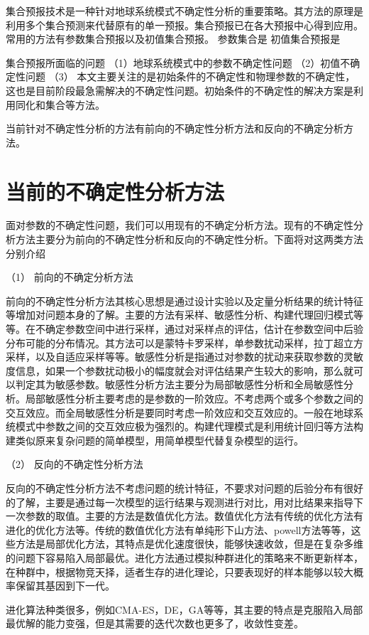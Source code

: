 集合预报技术是一种针对地球系统模式不确定性分析的重要策略。其方法的原理是利用多个集合预测来代替原有的单一预报。集合预报已在各大预报中心得到应用。常用的方法有参数集合预报以及初值集合预报。
参数集合是
初值集合预报是

集合预报所面临的问题
（1）地球系统模式中的参数不确定性问题
（2）初值不确定性问题
（3）
本文主要关注的是初始条件的不确定性和物理参数的不确定性，这也是目前阶段最急需解决的不确定性问题。初始条件的不确定性的解决方案是利用同化和集合等方法。

当前针对不确定性分析的方法有前向的不确定性分析方法和反向的不确定分析方法。

\section{当前的不确定性分析方法}
\label{sec:first}
面对参数的不确定性问题，我们可以用现有的不确定分析方法。现有的不确定性分析方法主要分为前向的不确定性分析和反向的不确定性分析。下面将对这两类方法分别介绍

（1）	前向的不确定分析方法

前向的不确定性分析方法其核心思想是通过设计实验以及定量分析结果的统计特征等增加对问题本身的了解。主要的方法有采样、敏感性分析、构建代理回归模式等等。在不确定参数空间中进行采样，通过对采样点的评估，估计在参数空间中后验分布可能的分布情况。其方法可以是蒙特卡罗采样，单参数扰动采样，拉丁超立方采样，以及自适应采样等等。敏感性分析是指通过对参数的扰动来获取参数的灵敏度信息，如果一个参数扰动极小的幅度就会对评估结果产生较大的影响，那么就可以判定其为敏感参数。敏感性分析方法主要分为局部敏感性分析和全局敏感性分析。局部敏感性分析主要考虑的是参数的一阶效应。不考虑两个或多个参数之间的交互效应。而全局敏感性分析是要同时考虑一阶效应和交互效应的。一般在地球系统模式中参数之间的交互效应极为强烈的。构建代理模式是利用统计回归等方法构建类似原来复杂问题的简单模型，用简单模型代替复杂模型的运行。

（2）	反向的不确定性分析方法

反向的不确定性分析方法不考虑问题的统计特征，不要求对问题的后验分布有很好的了解，主要是通过每一次模型的运行结果与观测进行对比，用对比结果来指导下一次参数的取值。主要的方法是数值优化方法。数值优化方法有传统的优化方法有进化的优化方法等。传统的数值优化方法有单纯形下山方法、powell方法等等，这些方法是局部优化方法，其特点是优化速度很快，能够快速收敛，但是在复杂多维的问题下容易陷入局部最优。进化方法通过模拟种群进化的策略来不断更新样本，在种群中，根据物竞天择，适者生存的进化理论，只要表现好的样本能够以较大概率保留其基因到下一代。

进化算法种类很多，例如CMA-ES，DE，GA等等，其主要的特点是克服陷入局部最优解的能力变强，但是其需要的迭代次数也更多了，收敛性变差。

